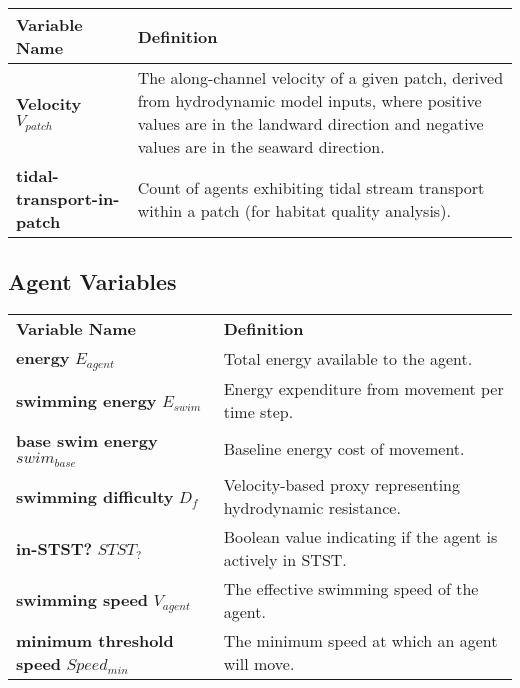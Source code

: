 \documentclass[
]{book}
\begin{document}
\begin{longtable}[]{@{}
  >{\centering\arraybackslash}p{}
  >{\centering\arraybackslash}p{}@{}}
\toprule\noalign{}
\begin{minipage}[b]{\linewidth}\centering
Variable Name
\end{minipage} & \begin{minipage}[b]{\linewidth}\centering
Definition
\end{minipage} \\
\midrule\noalign{}
\endhead
\bottomrule\noalign{}
\endlastfoot
\textbf{Velocity} \(V_{patch}\) & The along-channel velocity of a given patch, derived from hydrodynamic model inputs, where positive values are in the landward direction and negative values are in the seaward direction. \\
\textbf{tidal-transport-in-patch} & Count of agents exhibiting tidal stream transport within a patch (for habitat quality analysis). \\
\end{longtable}

\subsection{Agent Variables}\label{agent-variables-5}

\begin{longtable}[]{@{}
  >{\centering\arraybackslash}p{}
  >{\centering\arraybackslash}p{}@{}}
\toprule\noalign{}
\endhead
\bottomrule\noalign{}
\endlastfoot
\textbf{Variable Name} & \textbf{Definition} \\
\textbf{energy} \(E_{agent}\) & Total energy available to the agent. \\
\textbf{swimming energy} \(E_{swim}\) & Energy expenditure from movement per time step. \\
\textbf{base swim energy} \(swim_{base}\) & Baseline energy cost of movement. \\
\textbf{swimming difficulty} \(D_f\) & Velocity-based proxy representing hydrodynamic resistance. \\
\textbf{in-STST?} \(STST_{?}\) & Boolean value indicating if the agent is actively in STST. \\
\textbf{swimming speed} \(V_{agent}\) & The effective swimming speed of the agent. \\
\textbf{minimum threshold speed} \(Speed_{min}\) & The minimum speed at which an agent will move. \\
\end{longtable}
\end{document}
